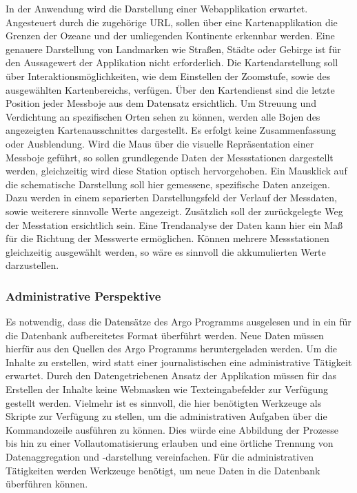     In der Anwendung wird die Darstellung einer Webapplikation erwartet. Angesteuert durch die zugehörige URL,  
    sollen über eine Kartenapplikation die Grenzen der Ozeane und der umliegenden Kontinente erkennbar werden.  Eine genauere Darstellung von Landmarken wie Straßen, Städte oder Gebirge ist für den Aussagewert der Applikation nicht erforderlich. Die Kartendarstellung soll über Interaktionsmöglichkeiten, wie dem Einstellen der Zoomstufe, sowie des ausgewählten Kartenbereichs, verfügen. Über den Kartendienst sind die letzte Position jeder Messboje aus dem Datensatz ersichtlich. Um Streuung und Verdichtung an spezifischen Orten sehen zu können, werden alle Bojen des angezeigten Kartenausschnittes dargestellt. Es erfolgt keine Zusammenfassung oder Ausblendung.
    Wird die Maus über die visuelle Repräsentation einer Messboje geführt, so sollen grundlegende Daten der Messstationen dargestellt werden, gleichzeitig wird diese Station optisch hervorgehoben.
    Ein Mausklick auf die schematische Darstellung soll hier gemessene, spezifische Daten anzeigen. Dazu werden in einem separierten Darstellungsfeld der Verlauf der Messdaten, sowie weiterere sinnvolle Werte angezeigt. Zusätzlich soll der zurückgelegte Weg der Messtation ersichtlich sein.  Eine Trendanalyse der Daten kann hier ein Maß für die Richtung der Messwerte ermöglichen. Können mehrere Messstationen gleichzeitig ausgewählt werden, so wäre es sinnvoll die akkumulierten Werte darzustellen.
    
    \subsubsection{Administrative Perspektive}
    
    Es notwendig, dass die Datensätze des Argo Programms ausgelesen und in ein für die Datenbank aufbereitetes Format überführt werden. Neue Daten müssen hierfür aus den Quellen des Argo Programms heruntergeladen werden. Um die Inhalte zu erstellen, wird statt einer journalistischen eine administrative Tätigkeit erwartet. Durch den Datengetriebenen Ansatz der Applikation müssen für das Erstellen der Inhalte keine Webmasken wie Texteingabefelder zur Verfügung gestellt werden. Vielmehr ist es sinnvoll, die hier benötigten Werkzeuge als Skripte zur Verfügung zu stellen, um die administrativen Aufgaben über die Kommandozeile ausführen zu können. Dies würde eine Abbildung der Prozesse bis hin zu einer Vollautomatisierung erlauben und eine örtliche Trennung von Datenaggregation und -darstellung vereinfachen.
    Für die administrativen Tätigkeiten werden Werkzeuge benötigt, um neue Daten  in die Datenbank überführen können.  
    

